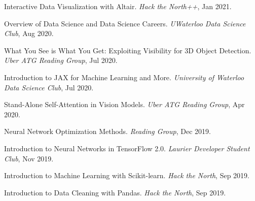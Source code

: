\documentclass[line,margin]{res}
\newcommand{\talk}[4]{#1. \textit{#2}, #4. \vspace{-2mm}}
\begin{document}
\begin{resume}
    \talk
    {Interactive Data Visualization with Altair}
    {Hack the North++}{Virtual}{Jan 2021}

    \talk
    {Overview of Data Science and Data Science Careers}
    {UWaterloo Data Science Club}{Waterloo}{Aug 2020}

    \talk
    {What You See is What You Get: Exploiting Visibility for 3D Object Detection}
    {Uber ATG Reading Group}{Toronto}{Jul 2020}

    \talk
    {Introduction to JAX for Machine Learning and More}
    {University of Waterloo Data Science Club}{Waterloo}{Jul 2020}

    \talk
    {Stand-Alone Self-Attention in Vision Models}
    {Uber ATG Reading Group}{Toronto}{Apr 2020}

    \talk
    {Neural Network Optimization Methods}
    {Reading Group}{Waterloo}{Dec 2019}

    \talk
    {Introduction to Neural Networks in TensorFlow 2.0}
    {Laurier Developer Student Club}{Waterloo}{Nov 2019}

    \talk
    {Introduction to Machine Learning with Scikit-learn}
    {Hack the North}{Waterloo}{Sep 2019}

    \talk
    {Introduction to Data Cleaning with Pandas}
    {Hack the North}{Waterloo}{Sep 2019}

\end{resume}
\end{document}
